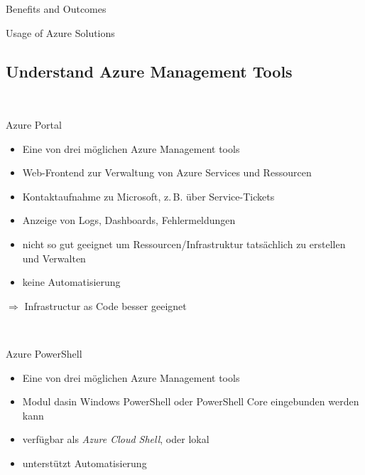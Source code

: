 \documentclass{scrartcl}
\newenvironment{flashcard}[2][]{%
    #1
    \vfill
    \centerline{\Large{#2}}
    \vfill
\newpage
}
{\newpage}
\newcommand{\subsectioncard}[1]{
    \vspace*{\stretch{1}}
    \subsection{#1}
    \vspace*{\stretch{1}}
    \pagebreak
}
\begin{document}
    \begin{flashcard}[Benefits and Outcomes]{Usage of Azure Solutions}

    \end{flashcard}

    \subsectioncard{Understand Azure Management Tools}

    \begin{flashcard}[\ ]{Azure Portal}
        \begin{itemize}
            \item Eine von drei möglichen Azure Management tools
            \item Web-Frontend zur Verwaltung von Azure Services und Ressourcen
            \item Kontaktaufnahme zu Microsoft, z.\,B. über Service-Tickets
            \item Anzeige von Logs, Dashboards, Fehlermeldungen
            \item nicht so gut geeignet um Ressourcen/Infrastruktur tatsächlich zu erstellen und Verwalten
            \item keine Automatisierung
        \end{itemize}
        $\Rightarrow$ Infrastructur as Code besser geeignet

    \end{flashcard}

    \begin{flashcard}[\ ]{Azure PowerShell}
        \begin{itemize}
            \item Eine von drei möglichen Azure Management tools
            \item Modul dasin Windows PowerShell oder PowerShell Core eingebunden werden kann
            \item verfügbar als \emph{Azure Cloud Shell}, oder lokal
            \item unterstützt Automatisierung
        \end{itemize}
    \end{flashcard}
\end{document}
